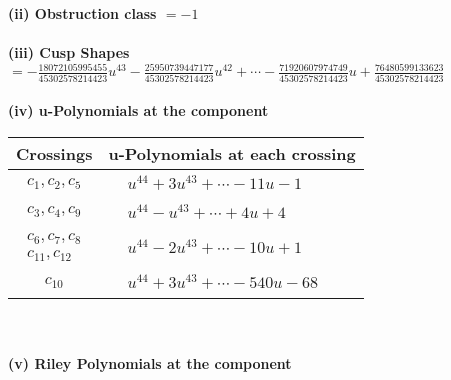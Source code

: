 \documentclass[1p]{elsarticle_modified}
\theoremstyle{definition}
\begin{document}
\flushleft \textbf{(ii) Obstruction class $= -1$}\\~\\
\flushleft \textbf{(iii) Cusp Shapes $= -\frac{18072105995455}{45302578214423} u^{43}-\frac{25950739447177}{45302578214423} u^{42}+\cdots-\frac{71920607974749}{45302578214423} u+\frac{76480599133623}{45302578214423}$}\\~\\
\newpage\renewcommand{\arraystretch}{1}
\flushleft \textbf{(iv) u-Polynomials at the component}\newline \\
\begin{tabular}{m{50pt}|m{274pt}}
Crossings & \hspace{64pt}u-Polynomials at each crossing \\
\hline $$\begin{aligned}c_{1},c_{2},c_{5}\end{aligned}$$&$\begin{aligned}
&u^{44}+3 u^{43}+\cdots-11 u-1
\end{aligned}$\\
\hline $$\begin{aligned}c_{3},c_{4},c_{9}\end{aligned}$$&$\begin{aligned}
&u^{44}- u^{43}+\cdots+4 u+4
\end{aligned}$\\
\hline $$\begin{aligned}c_{6},c_{7},c_{8}\\c_{11},c_{12}\end{aligned}$$&$\begin{aligned}
&u^{44}-2 u^{43}+\cdots-10 u+1
\end{aligned}$\\
\hline $$\begin{aligned}c_{10}\end{aligned}$$&$\begin{aligned}
&u^{44}+3 u^{43}+\cdots-540 u-68
\end{aligned}$\\
\hline
\end{tabular}\\~\\
\newpage\renewcommand{\arraystretch}{1}
\flushleft \textbf{(v) Riley Polynomials at the component}\newline \\
\end{document}
